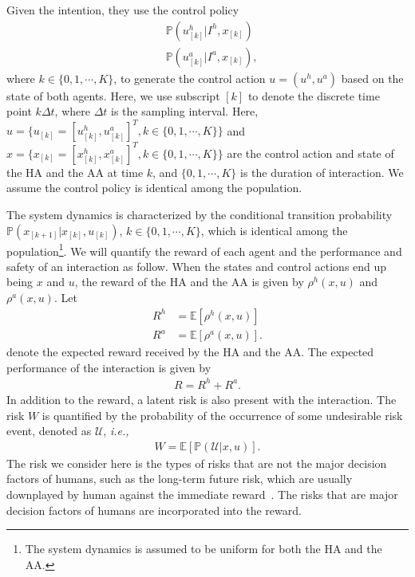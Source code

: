 \documentclass[letterpaper]{article} %
\newcommand{\ie}{\textit{i.e., }}
\begin{document}
Given the intention, they use the control policy
\begin{align}
 &\mathbb{P}(u^h_{[k]}| I^h,x_{[k]}) \\
 &\mathbb{P}(u^a_{[k]}|I^a,x_{[k]}),
\end{align}
where $k \in \{0,1,\cdots,K\}$, to generate the control action $u = (u^h, u^a)$ based on the state of both agents. 
Here, we use subscript $[k]$ to denote the discrete time point $k\Delta t$, where $\Delta t$ is the sampling interval. Here, $ u = \{ u_{[k]} = [u_{[k]}^{h} ,u_{[k]}^{a}]^T , k \in \{0,1,\cdots,K\} \} $ and $x = \{ x_{[k]} = [x_{[k]}^{h} ,x_{[k]}^{a}]^T , k \in \{0,1,\cdots,K\} \}$ are the control action and state of the HA and the AA at time $k$, and $\{0,1,\cdots,K\}$ is the duration of interaction. We assume the control policy is identical among the population.

The system dynamics is characterized by the conditional transition probability $\mathbb{P}(x_{[k+1]}|x_{[k]},u_{[k]})$, $k \in \{0,1,\cdots,K\}$, which is identical among the population\footnote{The system dynamics is assumed to be uniform for both the HA and the AA.}. We will quantify the reward of each agent and the performance and safety of an interaction as follow. When the states and control actions end up being $x$ and $u$, the reward of the HA and the AA is given by $\rho^h(x,u)$ and $\rho^a(x,u)$. Let 
\begin{align}
    R^h&=\mathbb{E}[\rho^h(x,u)]\\
    R^a&=\mathbb{E}[\rho^a(x,u)].
\end{align}
denote the expected reward received by the HA and the AA. The expected performance of the interaction is given by
\begin{align}
    R=R^h+R^a.
\end{align}
In addition to the reward, a latent risk is also present with the interaction. 
The risk $W$ is quantified by the probability of the occurrence of some undesirable risk event, denoted as $\mathcal{U}$, \ie
\begin{align}
    W=\mathbb{E}[\mathbb{P}(\mathcal{U}|x,u)].
\end{align}
The risk we consider here is the types of risks that are not the major decision factors of humans, such as the long-term future risk, which are usually downplayed by human against the immediate reward~\cite{shirado2020collective}. The risks that are major decision factors of humans are incorporated into the reward. 
\end{document}
